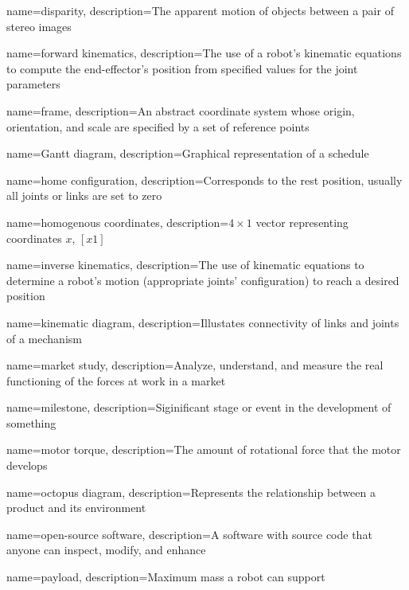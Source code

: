 \makeglossaries

{
    name=disparity,
    description={The apparent motion of objects between a pair of stereo images}
}

{
    name=forward kinematics,
    description={The use of a robot's kinematic equations to compute the end-effector's position from specified values for the joint parameters}
}

{
    name=frame,
    description={An abstract coordinate system whose origin, orientation, and scale are specified by a set of reference points}
}

{
    name=Gantt diagram,
    description={Graphical representation of a schedule}
}

{
    name=home configuration,
    description={Corresponds to the rest position, usually all joints or links are set to zero}
}

{
    name=homogenous coordinates,
    description={$4\times1$ vector representing coordinates $x$, $[x 1]$}
}

{
    name=inverse kinematics,
    description={The use of kinematic equations to determine a robot's motion (appropriate joints' configuration) to reach a desired position}
}

{
    name=kinematic diagram,
    description={Illustates connectivity of links and joints of a mechanism}
}

{
    name=market study,
    description={Analyze, understand, and measure the real functioning of the forces at work in a market}
}

{
    name=milestone,
    description={Siginificant stage or event in the development of something}
}

{
    name=motor torque,
    description={The amount of rotational force that the motor develops}
}

{
    name=octopus diagram,
    description={Represents the relationship between a product and its environment}
}

{
    name=open-source software,
    description={A software with source code that anyone can inspect, modify, and enhance}
}

{
    name=payload,
    description={Maximum mass a robot can support}
}

